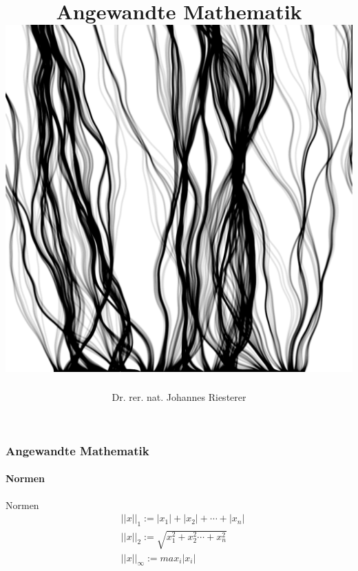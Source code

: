 \documentclass{beamer}
\begin{document}
\title[Angewandte Mathematik] %
{Angewandte Mathematik
\\
\includegraphics[scale=0.15]{images/cover}
}
\subtitle{}
\author[Dr. Johannes Riesterer] %
{Dr.  rer. nat. Johannes Riesterer}

\date[KPT 2004] %
{}

\subject{Angewandte Mathematik}

\frame{\titlepage}




\begin{frame}
    \frametitle{Angewandte Mathematik}
\framesubtitle{Normen}


 \begin{block}{Normen}
\begin{align*}
 & ||x||_1 :=|x_1| + |x_2| + \cdots + |x_n| \\
 & ||x||_2 :=  \sqrt{x_1^2 + x_2^2 \cdots + x_n^2} \\
& ||x||_\infty := max_{i} |x_i|
\end{align*}
\end{block}


 \end{frame}
\end{document}
